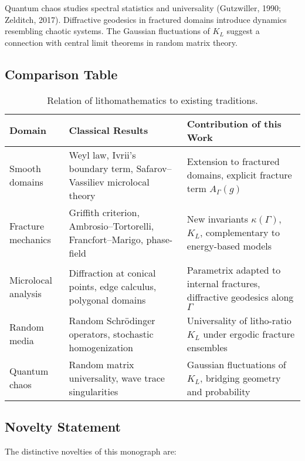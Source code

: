 Quantum chaos studies spectral statistics and universality (Gutzwiller, 1990;
Zelditch, 2017). Diffractive geodesics in fractured domains introduce dynamics
resembling chaotic systems. The Gaussian fluctuations of $K_L$ suggest a
connection with central limit theorems in random matrix theory.

\subsection{Comparison Table}

\begin{table}[h]
\centering
\begin{tabular}{|p{3.8cm}|p{5.0cm}|p{5.0cm}|}
\hline
\textbf{Domain} & \textbf{Classical Results} & \textbf{Contribution of this Work} \\
\hline
Smooth domains & Weyl law, Ivrii’s boundary term,
  Safarov–Vassiliev microlocal theory &
  Extension to fractured domains, explicit fracture term $A_\Gamma(g)$ \\
\hline
Fracture mechanics & Griffith criterion,
  Ambrosio–Tortorelli, Francfort–Marigo,
  phase-field &
  New invariants $\kappa(\Gamma)$, $K_L$,
  complementary to energy-based models \\
\hline
Microlocal analysis & Diffraction at conical points,
  edge calculus, polygonal domains &
  Parametrix adapted to internal fractures,
  diffractive geodesics along $\Gamma$ \\
\hline
Random media & Random Schrödinger operators,
  stochastic homogenization &
  Universality of litho-ratio $K_L$ under
  ergodic fracture ensembles \\
\hline
Quantum chaos & Random matrix universality,
  wave trace singularities &
  Gaussian fluctuations of $K_L$,
  bridging geometry and probability \\
\hline
\end{tabular}
\caption{Relation of lithomathematics to existing traditions.}
\end{table}

\subsection{Novelty Statement}

The distinctive novelties of this monograph are:

